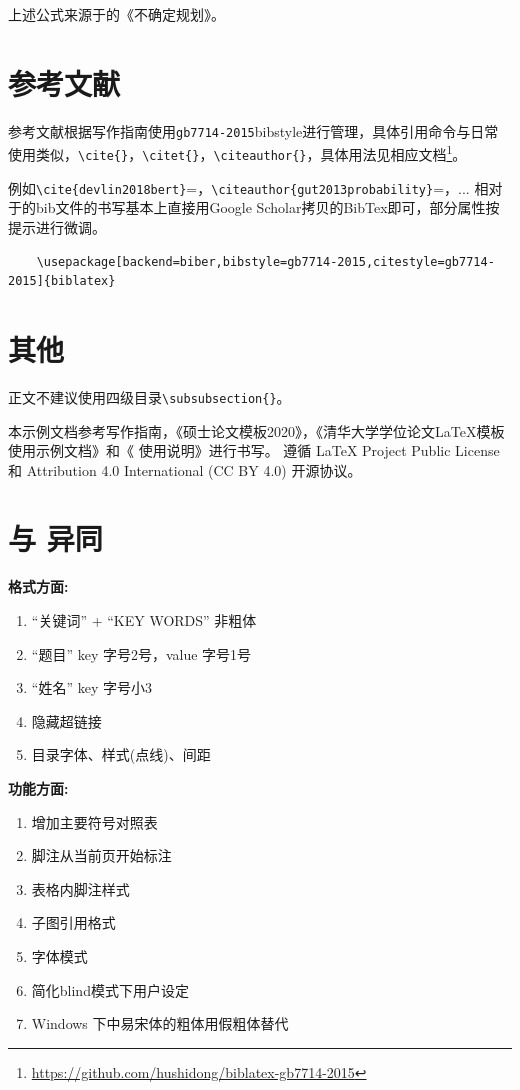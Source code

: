 上述公式来源于\citeauthor{liu2003uncertain}的《不确定规划》\citet{liu2003uncertain}。

\section{参考文献}
\label{sec:bibtex}

参考文献根据写作指南使用\verb|gb7714-2015|bibstyle进行管理，具体引用命令与日常使用类似，\verb|\cite{}|，\verb|\citet{}|，\verb|\citeauthor{}|，具体用法见相应文档\footnote{\url{https://github.com/hushidong/biblatex-gb7714-2015}}。

例如\verb|\cite{devlin2018bert}|=\cite{devlin2018bert}，\verb|\citeauthor{gut2013probability}|=\citeauthor{gut2013probability}，...
相对于的bib文件的书写基本上直接用Google Scholar拷贝的BibTex即可，部分属性按提示进行微调。
\begin{Verbatim}
    \usepackage[backend=biber,bibstyle=gb7714-2015,citestyle=gb7714-2015]{biblatex}
\end{Verbatim}

\section{其他}
\label{sec:other}

正文不建议使用四级目录\verb|\subsubsection{}|。

本示例文档参考写作指南，《硕士论文模板2020》，《清华大学学位论文\LaTeX{}模板使用示例文档》和《\pkuthss{} 使用说明》进行书写。
遵循 \LaTeX{} Project Public License 和 Attribution 4.0 International (CC BY 4.0) 开源协议。

\section{与\pkuthss{} \iofubaseversion{}异同}

\textbf{格式方面:}

\begin{enumerate}
    \item ``关键词” + ``KEY WORDS” 非粗体 
    \item ``题目” key 字号2号，value 字号1号
    \item ``姓名” key 字号小3
    \item 隐藏超链接
    \item 目录字体、样式(点线)、间距
\end{enumerate}

\textbf{功能方面:}

\begin{enumerate}
    \item 增加主要符号对照表
    \item 脚注从当前页开始标注
    \item 表格内脚注样式
    \item 子图引用格式
    \item 字体模式
    \item 简化blind模式下用户设定
    \item Windows 下中易宋体的粗体用假粗体替代
\end{enumerate}
